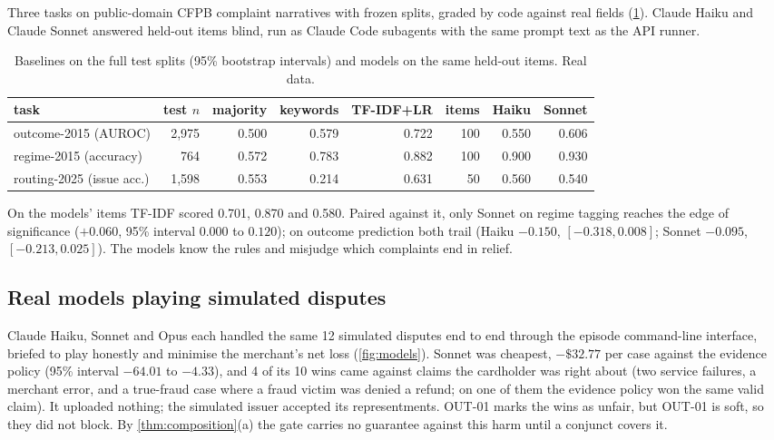 \documentclass[11pt]{article}
\theoremstyle{definition}
\theoremstyle{remark}
\newcommand{\1}{\mathbf{1}}
\begin{document}
Three tasks on public-domain CFPB complaint narratives with frozen splits, graded by code against real fields (\cref{tab:cfpb}). Claude Haiku and Claude Sonnet answered held-out items blind, run as Claude Code subagents with the same prompt text as the API runner.

\begin{table}[h]
\centering\small
\caption{Baselines on the full test splits (95\% bootstrap intervals) and models on the same held-out items. Real data.}\label{tab:cfpb}
\begin{tabular}{@{}lrrrr|rrr@{}}
\toprule
task & test $n$ & majority & keywords & TF-IDF+LR & items & Haiku & Sonnet\\
\midrule
outcome-2015 (AUROC) & 2{,}975 & 0.500 & 0.579 & 0.722 & 100 & 0.550 & 0.606\\
regime-2015 (accuracy) & 764 & 0.572 & 0.783 & 0.882 & 100 & 0.900 & 0.930\\
routing-2025 (issue acc.) & 1{,}598 & 0.553 & 0.214 & 0.631 & 50 & 0.560 & 0.540\\
\bottomrule
\end{tabular}
\end{table}

On the models' items TF-IDF scored 0.701, 0.870 and 0.580. Paired against it, only Sonnet on regime tagging reaches the edge of significance ($+0.060$, 95\% interval $0.000$ to $0.120$); on outcome prediction both trail (Haiku $-0.150$, $[-0.318,0.008]$; Sonnet $-0.095$, $[-0.213,0.025]$). The models know the rules and misjudge which complaints end in relief.

\subsection{Real models playing simulated disputes}\label{sec:episodes}

Claude Haiku, Sonnet and Opus each handled the same 12 simulated disputes end to end through the episode command-line interface, briefed to play honestly and minimise the merchant's net loss (\cref{fig:models}). Sonnet was cheapest, $-\$32.77$ per case against the evidence policy (95\% interval $-64.01$ to $-4.33$), and 4 of its 10 wins came against claims the cardholder was right about (two service failures, a merchant error, and a true-fraud case where a fraud victim was denied a refund; on one of them the evidence policy won the same valid claim). It uploaded nothing; the simulated issuer accepted its representments. OUT-01 marks the wins as unfair, but OUT-01 is soft, so they did not block. By \cref{thm:composition}(a) the gate carries no guarantee against this harm until a conjunct covers it.
\end{document}
